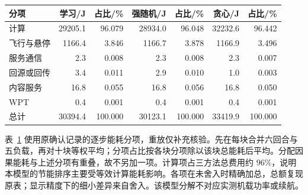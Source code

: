 \begin{table}[!htbp]
 \centering
 \label{tab:ch5-energy-components}
 \small
 \setlength{\tabcolsep}{4pt}
 \begin{tabular}{lrrrrrr}
  \toprule
  分项 & 学习/J & 占比/\% & 强随机/J & 占比/\% & 贪心/J & 占比/\% \\
  \midrule
  计算 & 29205.1 & 96.079 & 28934.0 & 96.048 & 32232.6 & 96.442 \\
  飞行与悬停 & 1166.4 & 3.846 & 1166.7 & 3.878 & 1166.9 & 3.496 \\
  服务通信 & 2.3 & 0.008 & 2.3 & 0.008 & 2.3 & 0.007 \\
  回源或回传 & 3.4 & 0.011 & 2.9 & 0.010 & 1.0 & 0.003 \\
  内容服务 & 16.8 & 0.055 & 16.8 & 0.056 & 16.8 & 0.050 \\
  WPT & 0.4 & 0.001 & 0.4 & 0.001 & 0.4 & 0.001 \\
  \midrule
  总计 & 30394.4 & 100.000 & 30123.1 & 100.000 & 33419.9 & 100.000 \\
  \bottomrule
 \end{tabular}
\end{table}

表~\ref{tab:ch5-energy-components} 使用原确认记录的逐步能耗分项，重放仅补充核验。先在每块合并六回合与五负载，再对十块等权平均；分项占比按各块分项除以该块总能耗后平均。分配因果能耗与上述分项有重叠，故不另加一项。计算项占三方法总费用约 $96\%$，说明本模型的节能排序主要受等效计算能耗影响。各项在未舍入时精确加总，总额复现原表；显示精度下的细小差异来自舍入。该模型分解不对应实测机载功率或续航。

